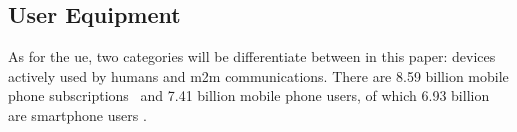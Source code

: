 \documentclass[11pt,a4paper]{article}
\begin{document}
\subsection{User Equipment}\label{subsec:UEInfluence}
As for the \acrlong{ue}, two categories will be differentiate between in this paper: devices actively used by humans and \acrfull{m2m} communications.
There are 8.59 billion mobile phone subscriptions~\citep{mobilephonesWorld} and 7.41 billion mobile phone users, of which 6.93 billion are smartphone users \citep{mobileusersWorld}.
\end{document}
